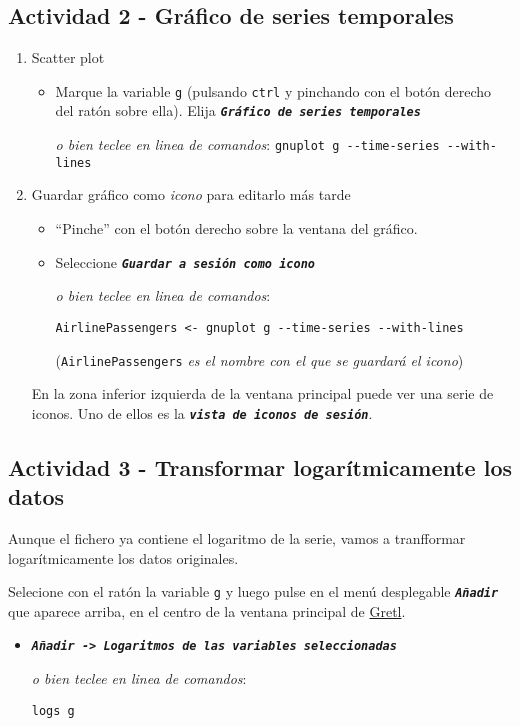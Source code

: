 \documentclass[11pt]{article}
\begin{document}
\subsection{Actividad 2 - Gráfico de series temporales}
\label{sec:org2b31b9a}
\begin{enumerate}
\item Scatter plot
\label{sec:org0aa7ca4}
\begin{itemize}
\item Marque la variable \texttt{g} (pulsando \texttt{ctrl} y pinchando con el botón
derecho del ratón sobre ella). Elija \textbf{\emph{\texttt{Gráfico de series temporales}}}

{\vspace{1pt} \footnotesize \color{gray!70!black}
\emph{o bien teclee en linea de comandos}: \texttt{gnuplot g -{}-{}time-series -{}-{}with-lines}
}
\end{itemize}

\item Guardar gráfico como \emph{icono} para editarlo más tarde
\label{sec:orgf3eeb66}
\begin{itemize}
\item ``Pinche'' con el botón derecho sobre la ventana del gráfico.
\item Seleccione \textbf{\emph{\texttt{Guardar a sesión como icono}}}

{\vspace{1pt} \footnotesize \color{gray!70!black} \color{gray!70!black}
\emph{o bien teclee en linea de comandos}:
\begin{verbatim}
AirlinePassengers <- gnuplot g --time-series --with-lines
\end{verbatim}
(\texttt{AirlinePassengers} \emph{es el nombre con el que se guardará el icono})
}
\end{itemize}

En la zona inferior izquierda de la ventana principal puede ver una
serie de iconos. Uno de ellos es la \textbf{\emph{\texttt{vista de iconos de sesión}}}.
\end{enumerate}


\subsection{Actividad 3 - Transformar logarítmicamente los datos}
\label{sec:org726c40f}
Aunque el fichero ya contiene el logaritmo de la serie, vamos a
tranfformar logarítmicamente los datos originales.

Selecione con el ratón la variable \texttt{g} y luego pulse en el menú desplegable \textbf{\emph{\texttt{Añadir}}} que aparece arriba, en el centro de la
ventana principal de \href{https://gretl.sourceforge.net/es.html}{Gretl}.
\begin{itemize}
\item \textbf{\emph{\texttt{Añadir -> Logaritmos de las variables seleccionadas}}}

{\vspace{0pt} \footnotesize \color{gray!70!black}
\emph{o bien teclee en linea de comandos}: 
\begin{verbatim}
logs g
\end{verbatim}
}
\end{itemize}
\end{document}
